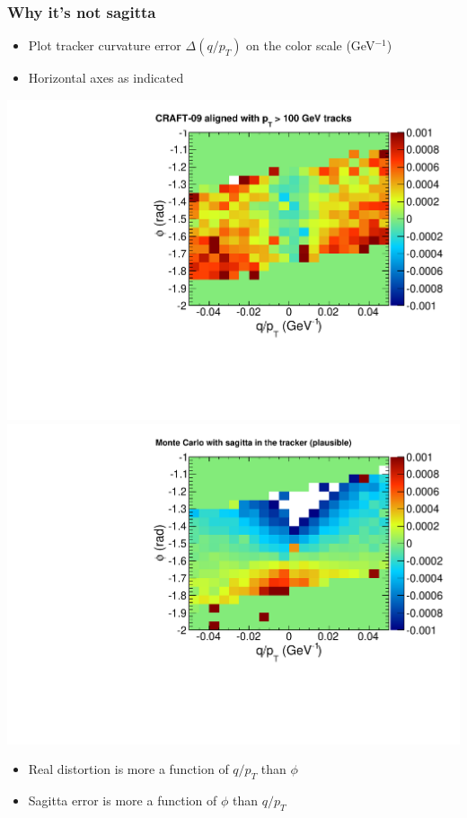 \documentclass[compress]{beamer}
\begin{document}
\begin{frame}
\frametitle{Why it's not sagitta}

\begin{itemize}
\item Plot tracker curvature error $\Delta (q/p_T)$ on the color scale (GeV$^{-1}$)
\item Horizontal axes as indicated
\end{itemize}

\includegraphics[width=0.5\linewidth]{2d_real.pdf}
\includegraphics[width=0.5\linewidth]{2d_sagitta.pdf}

\begin{itemize}
\item Real distortion is more a function of $q/p_T$ than $\phi$
\item Sagitta error is more a function of $\phi$ than $q/p_T$
\end{itemize}

\end{frame}
\end{document}
